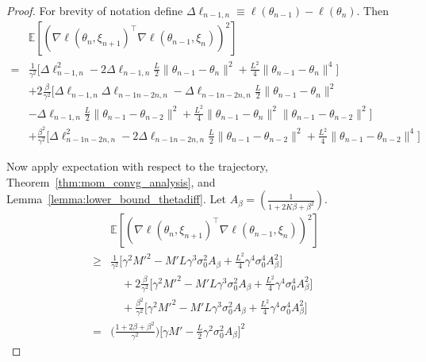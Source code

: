 \documentclass[conference]{IEEEtran}
\newcommand{\Ex}[1]{\mathbb{E}[ #1 ]}
\begin{document}
\begin{proof}
For brevity of notation define $\Delta \ell _{n-1, n} \equiv \ell ( \theta_{n-1} ) - \ell ( \theta_n )$. Then
\begin{align*}
&\Ex{ ( \nabla \ell ( \theta_n, \xi_{n+1} )^\top \nabla \ell ( \theta_{n-1}, \xi_n ) )^2 } \\
=& \frac{1}{\gamma^2} \biggl[ \Delta \ell _{n-1, n}^2 - 2 \Delta \ell _{n-1, n} \frac{L}{2} \| \theta_{n-1} - \theta_n \|^2 + \frac{L^2}{4} \| \theta_{n-1} - \theta_n \|^4 \biggr] \\
&+ 2 \frac{\beta}{\gamma^2} \biggl[ \Delta \ell _{n-1, n} \Delta \ell_{n-1n-2n, n} - \Delta \ell _{n-1n-2n, n} \frac{L}{2} \| \theta_{n-1} - \theta_n \|^2 \\
&- \Delta \ell_{n-1,n} \frac{L}{2} \| \theta_{n-1} - \theta_{n-2} \|^2  + \frac{L^2}{4} \| \theta_{n-1} - \theta_n \|^2 \| \theta_{n-1} - \theta_{n-2} \|^2 \biggr] \\
& + \frac{\beta^2}{\gamma^2} \biggl[ \Delta \ell_{n-1n-2n,n}^2 - 2 \Delta \ell_{n-1n-2n,n} \frac{L}{2} \| \theta_{n-1} - \theta_{n-2} \|^2 + \frac{L^2}{4} \| \theta_{n-1} - \theta_{n-2} \|^4 \biggr]
\end{align*}

Now apply expectation with respect to the trajectory, Theorem~\ref{thm:mom_convg_analysis}, and Lemma~\ref{lemma:lower_bound_thetadiff}. Let $A_\beta = (\frac{1}{1 + 2 K \beta + \beta^2})$.
\begin{align*}
&\Ex{ ( \nabla \ell ( \theta_n, \xi_{n+1} )^\top \nabla \ell ( \theta_{n-1}, \xi_n ) )^2 } \\
\geq& \frac{1}{\gamma^2} \biggl[ \gamma^2 M'^2 - M' L \gamma^3 \sigma_0^2 A_\beta + \frac{L^2}{4} \gamma^4 \sigma_0^4 A_\beta^2 \biggr] \\
&\quad + 2 \frac{\beta}{\gamma^2} \biggl[ \gamma^2 M'^2 - M' L \gamma^3 \sigma_0^2 A_\beta + \frac{L^2}{4} \gamma^4 \sigma_0^4 A_\beta^2 \biggr] \\
&\quad + \frac{\beta^2}{\gamma^2} \biggl[ \gamma^2 M'^2 - M' L \gamma^3 \sigma_0^2 A_\beta + \frac{L^2}{4} \gamma^4 \sigma_0^4 A_\beta^2 \biggr] \\
=& \biggl( \frac{1 + 2 \beta + \beta^2}{\gamma^2} \biggr) \biggl[ \gamma M' - \frac{L}{2} \gamma^2 \sigma_0^2 A_\beta \biggr]^2
\end{align*}


\end{proof}
\end{document}
